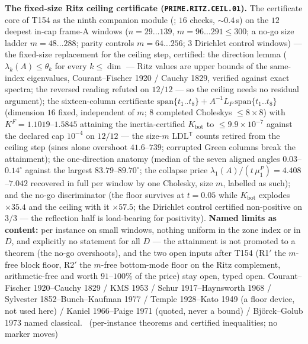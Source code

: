 \documentclass[11pt,a4paper]{article}
\theoremstyle{definition}
\begin{document}
\par\smallskip\noindent\textbf{The fixed-size Ritz ceiling certificate
(\texttt{PRIME.RITZ.CEIL.01}).}
The certificate core of T154 as the ninth companion module
(; $16$ checks, ${\sim}0.4$\,s)
on the $12$ deepest in-cap frame-A windows ($n=29\ldots139$,
$m=96\ldots291\le300$; a no-go size ladder $m=48\ldots288$; parity
controls $m=64\ldots256$; $3$ Dirichlet control windows) --- the
fixed-size replacement for the ceiling step, certified: the direction
lemma ($\lambda_k(A)\le\theta_k$ for every $k\le\dim$ --- Ritz values are
upper bounds of the same-index eigenvalues, Courant--Fischer 1920 /
Cauchy 1829, verified against exact spectra; the reversed reading refuted
on $12/12$ --- so the ceiling needs no residual argument); the
sixteen-column certificate
$\mathrm{span}\{t_1..t_8\}+A^{-1}L_P\,\mathrm{span}\{t_1..t_8\}$
(dimension $16$ fixed, independent of $m$; $8$ completed Choleskys
$\le8\times8$) with $K^F=1.1019$--$1.5845$ attaining the
inertia-certified $K_{\mathrm{bot}}$ to $\le9.9\times10^{-7}$ against the
declared cap $10^{-4}$ on $12/12$ --- the size-$m$ LDL$^{\mathsf T}$
counts retired from the ceiling step (sines alone overshoot
$41.6$--$739$; corrupted Green columns break the attainment); the
one-direction anatomy (median of the seven aligned angles
$0.03$--$0.14^\circ$ against the largest $83.79$--$89.70^\circ$; the
collapse price $\lambda_1(A)/(t\,\mu^P_1)=4.408$--$7.042$ recovered in
full per window by one Cholesky, size $m$, labelled as such); and the
no-go discriminator (the floor survives at $t=0.05$ while
$K_{\mathrm{bot}}$ explodes $\times35.4$ and the ceiling with it
$\times57.5$; the Dirichlet control certified non-positive on $3/3$ ---
the reflection half is load-bearing for positivity).
\textbf{Named limits as content:} per instance on small windows, nothing
uniform in the zone index or in $D$, and explicitly no statement for all
$D$ --- the attainment is not promoted to a theorem (the no-go
overshoots), and the two open inputs after T154 (R1$'$ the $m$-free block
floor, R2$'$ the $m$-free bottom-mode floor on the Ritz complement,
arithmetic-free and worth $91$--$100\%$ of the price) stay open, typed
open. Courant--Fischer 1920--Cauchy 1829 / KMS 1953 / Schur
1917--Haynsworth 1968 / Sylvester 1852--Bunch--Kaufman 1977 / Temple
1928--Kato 1949 (a floor device, not used here) / Kaniel 1966--Paige 1971
(quoted, never a bound) / Bj\"orck--Golub 1973 named classical.
\mE\ (per-instance theorems and certified inequalities; no marker moves)
\par\smallskip
\end{document}
